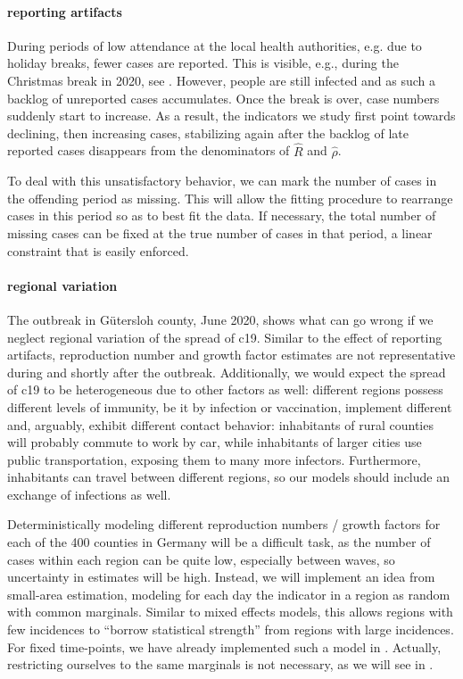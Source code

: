 \paragraph{reporting artifacts}
During periods of low attendance at the local health authorities, e.g. due to holiday breaks, fewer cases are reported. This is visible, e.g., during the Christmas break in 2020, see . However, people are still infected and as such a backlog of unreported cases accumulates. Once the break is over, case numbers suddenly start to increase. As a result, the indicators we study first point towards declining, then increasing cases, stabilizing again after the backlog of late reported cases disappears from the denominators of $\hat R$ and $\hat \rho$. 

To deal with this unsatisfactory behavior, we can mark the number of cases in the offending period as missing. This will allow the fitting procedure to rearrange cases in this period so as to best fit the data. If necessary, the total number of missing cases can be fixed at the true number of cases in that period, a linear constraint that is easily enforced.
\bigskip


\paragraph{regional variation}
The outbreak in Gütersloh county, June 2020, shows what can go wrong if we neglect regional variation of the spread of \acrshort{c19}. Similar to the effect of reporting artifacts, reproduction number and growth factor estimates are  not representative during and shortly after the outbreak. Additionally, we would expect the spread of \acrshort{c19} to be heterogeneous due to other factors as well: different regions possess different levels of immunity, be it by infection or vaccination, implement different  and, arguably, exhibit different contact behavior: inhabitants of rural counties will probably commute to work by car, while inhabitants of larger cities use public transportation, exposing them to many more infectors. Furthermore, inhabitants can travel between different regions, so our models should include an exchange of infections as well. 

Deterministically modeling different reproduction numbers / growth factors for each of the 400 counties in Germany will be a difficult task, as the number of cases within each region can be quite low, especially between waves, so uncertainty in estimates will be high. Instead, we will implement an idea from small-area estimation, modeling for each day the indicator in a region as random with common marginals. Similar to mixed effects models, this allows regions with few incidences to ``borrow statistical strength'' from regions with large incidences. For fixed time-points, we have already implemented such a model in \citep{Burgard2021Regional}. Actually, restricting ourselves to the same marginals is not necessary, as we will see in . 

